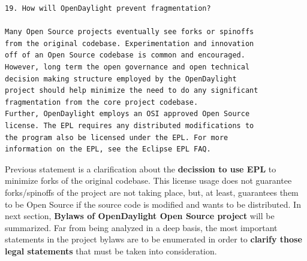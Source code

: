 \documentclass[a4paper, 12pt]{book}
\begin{document}
\begin{verbatim}
19. How will OpenDaylight prevent fragmentation?

Many Open Source projects eventually see forks or spinoffs
from the original codebase. Experimentation and innovation
off of an Open Source codebase is common and encouraged.
However, long term the open governance and open technical
decision making structure employed by the OpenDaylight
project should help minimize the need to do any significant
fragmentation from the core project codebase.
Further, OpenDaylight employs an OSI approved Open Source
license. The EPL requires any distributed modifications to
the program also be licensed under the EPL. For more
information on the EPL, see the Eclipse EPL FAQ.
\end{verbatim}
\noindent Previous statement is a clarification about the \textbf{decission to use EPL} to minimize forks of the original codebase. This license usage does not guarantee forks/spinoffs of the project are not taking place, but, at least, guarantees them to be Open Source if the source code is modified and wants to be distributed. In next section, \textbf{Bylaws of OpenDaylight Open Source project} will be summarized. Far from being analyzed in a deep basis, the most important statements in the project bylaws are to be enumerated in order to \textbf{clarify those legal statements} that must be taken into consideration.
\end{document}
